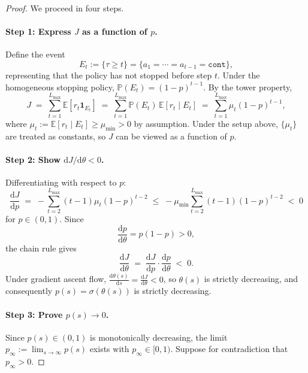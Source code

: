 \begin{proof}
We proceed in four steps.

\paragraph{Step 1: Express $J$ as a function of $p$.} Define the event
\begin{equation}
    E_t := \{\tau \geq t\} = \{a_1 = \cdots = a_{t-1} = \texttt{cont}\},
\end{equation}
representing that the policy has not stopped before step $t$. Under the homogeneous stopping policy, $\mathbb{P}(E_t) = (1-p)^{t-1}$. By the tower property,
\begin{equation}
    J \;=\; \sum_{t=1}^{L_{\max}} \mathbb{E}[r_t \mathbf{1}_{E_t}]
    \;=\; \sum_{t=1}^{L_{\max}} \mathbb{P}(E_t)\,\mathbb{E}[r_t \mid E_t]
    \;=\; \sum_{t=1}^{L_{\max}} \mu_t (1-p)^{t-1},
\end{equation}
where $\mu_t := \mathbb{E}[r_t \mid E_t] \geq \mu_{\min} > 0$ by assumption. Under the setup above, $\{\mu_t\}$ are treated as constants, so $J$ can be viewed as a function of $p$.

\paragraph{Step 2: Show $\mathrm{d}J/\mathrm{d}\theta < 0$.} Differentiating with respect to $p$:
\begin{equation}
    \frac{\mathrm{d}J}{\mathrm{d}p}
    \;=\; -\sum_{t=2}^{L_{\max}} (t-1)\mu_t (1-p)^{t-2}
    \;\leq\; -\mu_{\min} \sum_{t=2}^{L_{\max}} (t-1)(1-p)^{t-2}
    \;<\; 0
\end{equation}
for $p \in (0,1)$. Since
\begin{equation}
    \frac{\mathrm{d}p}{\mathrm{d}\theta} = p(1-p) > 0,
\end{equation}
the chain rule gives
\begin{equation}
    \frac{\mathrm{d}J}{\mathrm{d}\theta}
    \;=\; \frac{\mathrm{d}J}{\mathrm{d}p}\cdot \frac{\mathrm{d}p}{\mathrm{d}\theta}
    \;<\; 0.
\end{equation}
Under gradient ascent flow, $\frac{\mathrm{d}\theta(s)}{\mathrm{d}s} = \frac{\mathrm{d}J}{\mathrm{d}\theta}<0$, so $\theta(s)$ is strictly decreasing, and consequently $p(s)=\sigma(\theta(s))$ is strictly decreasing.

\paragraph{Step 3: Prove $p(s) \to 0$.} Since $p(s)\in(0,1)$ is monotonically decreasing, the limit $p_\infty := \lim_{s \to \infty} p(s)$ exists with $p_\infty \in [0,1)$. Suppose for contradiction that $p_\infty > 0$. 


\end{proof}
